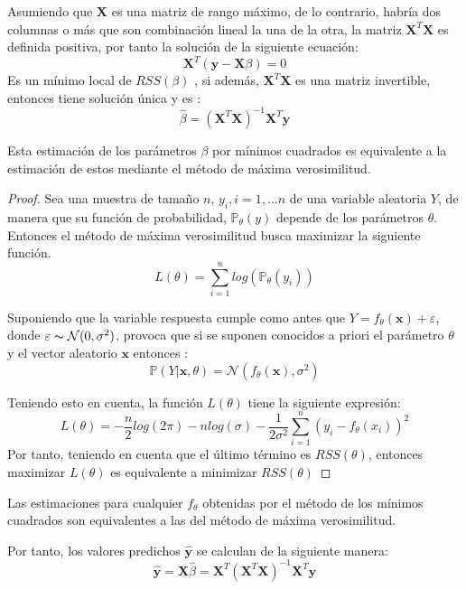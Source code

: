 \noindent Asumiendo que $\textbf{X}$ es una matriz de rango máximo, de lo contrario, habría dos columnas o más que son combinación lineal la una de la otra, la matriz $\textbf{X}^T\textbf{X}$ es definida positiva, por tanto la solución de la siguiente ecuación:
\begin{equation}
\textbf{X}^T(\textbf{y}-\textbf{X}\beta)=0
\end{equation}
Es un mínimo local de $RSS(\beta)$ , si además, $\textbf{X}^T\textbf{X}$ es una matriz invertible, entonces tiene solución única y es :
\begin{equation}
\hat{\beta}=(\textbf{X}^T\textbf{X})^{-1}\textbf{X}^T\textbf{y}
\end{equation}
\begin{propo}
Esta estimación de los parámetros $\beta$ por mínimos cuadrados es equivalente a la estimación de estos mediante el método de máxima verosimilitud.
\begin{proof}
Sea una muestra de tamaño $n$, $y_i, i=1,\ldots n$ de una variable aleatoria $Y$, de manera que su función de probabilidad, $\mathbb{P}_\theta(y)$ depende de los parámetros $\theta$. Entonces el método de máxima verosimilitud busca maximizar la siguiente función.
\begin{equation}
L(\theta)=\sum_{i=1}^n log( \mathbb{P}_{\theta}(y_i))
\end{equation}

\noindent Suponiendo que la variable respuesta cumple como antes que  $Y=f_\theta (\textbf{x})+\varepsilon$, donde $\varepsilon \thicksim \mathcal{N}(0,\sigma^2)$, provoca que si se suponen conocidos a priori el parámetro $\theta$ y el vector aleatorio $\textbf{x}$ entonces :
\begin{equation}
\mathbb{P}(Y|\textbf{x},\theta)=\mathcal{N}(f_\theta(\textbf{x}), \sigma^2)
\end{equation}

\noindent Teniendo esto en cuenta, la función $L(\theta)$ tiene la siguiente expresión:
\begin{equation}
L(\theta)=-\dfrac{n}{2}log(2\pi)-n log(\sigma)-\dfrac{1}{2\sigma^2}\sum_{i=1}^n (y_i-f_\theta (x_i))^2
\end{equation}
Por tanto, teniendo en cuenta que el último término es $RSS(\theta)$, entonces maximizar $L(\theta)$ es equivalente a minimizar $RSS(\theta)$
\end{proof}
\end{propo}
\begin{coro}
Las estimaciones para cualquier $f_{\theta}$ obtenidas por el método de los mínimos cuadrados son equivalentes a las del método de máxima verosimilitud.  
\end{coro}
\noindent Por tanto, los valores predichos $\hat{\textbf{y}}$ se calculan de la siguiente manera:
\begin{equation}
\hat{\textbf{y}}=\textbf{X}\hat{\beta}=\textbf{X}^T(\textbf{X}^T\textbf{X})^{-1}\textbf{X}^T\textbf{y}
\end{equation}


